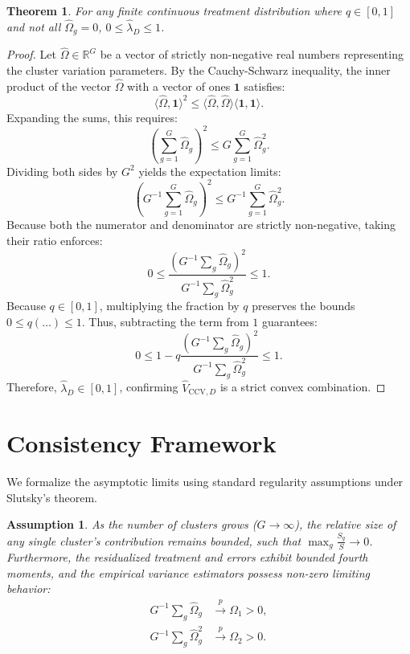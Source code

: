 \documentclass[11pt, letterpaper]{article}
\newtheorem{theorem}{Theorem}
\newtheorem{assumption}{Assumption}
\theoremstyle{remark}
\newcommand{\Omegahat}{\widehat{\Omega}}
\begin{document}
\begin{theorem}
For any finite continuous treatment distribution where $q \in [0,1]$ and not all $\widehat\Omega_g = 0$, $0 \leq \widehat\lambda_D \leq 1$.
\end{theorem}
\begin{proof}
Let $\Omegahat \in \mathbb{R}^G$ be a vector of strictly non-negative real numbers representing the cluster variation parameters. By the Cauchy-Schwarz inequality, the inner product of the vector $\Omegahat$ with a vector of ones $\mathbf{1}$ satisfies:
\begin{equation*}
    \langle \Omegahat, \mathbf{1} \rangle^2 \leq \langle \Omegahat, \Omegahat \rangle \langle \mathbf{1}, \mathbf{1} \rangle.
\end{equation*}
Expanding the sums, this requires:
\begin{equation*}
    \left( \sum_{g=1}^G \widehat\Omega_g \right)^2 \leq G \sum_{g=1}^G \widehat\Omega_g^2.
\end{equation*}
Dividing both sides by $G^2$ yields the expectation limits:
\begin{equation*}
    \left( G^{-1}\sum_{g=1}^G \widehat\Omega_g \right)^2 \leq G^{-1}\sum_{g=1}^G \widehat\Omega_g^2.
\end{equation*}
Because both the numerator and denominator are strictly non-negative, taking their ratio enforces:
\begin{equation*}
    0 \leq \frac{ \left( G^{-1}\sum_g \widehat\Omega_g \right)^2 }{ G^{-1}\sum_g \widehat\Omega_g^2 } \leq 1.
\end{equation*}
Because $q \in [0,1]$, multiplying the fraction by $q$ preserves the bounds $0 \leq q(\dots) \leq 1$. Thus, subtracting the term from $1$ guarantees:
\begin{equation*}
    0 \leq 1 - q \frac{\left(G^{-1}\sum_g \widehat\Omega_g\right)^2}{G^{-1}\sum_g \widehat\Omega_g^2} \leq 1.
\end{equation*}
Therefore, $\widehat\lambda_D \in [0,1]$, confirming $\widehat V_{\text{CCV},D}$ is a strict convex combination.
\end{proof}

\section{Consistency Framework}

We formalize the asymptotic limits using standard regularity assumptions under Slutsky's theorem.

\begin{assumption}
As the number of clusters grows ($G \to \infty$), the relative size of any single cluster's contribution remains bounded, such that $\max_g \frac{S_g}{S} \to 0$. Furthermore, the residualized treatment and errors exhibit bounded fourth moments, and the empirical variance estimators possess non-zero limiting behavior:
\begin{align*}
    G^{-1}\sum_g \widehat\Omega_g &\xrightarrow{p} \Omega_1 > 0, \\
    G^{-1}\sum_g \widehat\Omega_g^2 &\xrightarrow{p} \Omega_2 > 0.
\end{align*}
\end{assumption}
\end{document}
